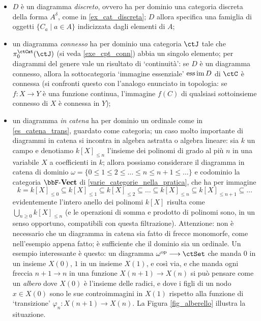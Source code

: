 \begin{itemize}
 \item \(D\) è un diagramma \emph{discreto}, ovvero ha per dominio una categoria discreta della forma \(A^\delta\), come in \ref{ex_cat_discreta}; \(D\) allora specifica una famiglia di oggetti \(\{C_a\mid a\in A\}\) indicizzata dagli elementi di \(A\);
 \item un diagramma \emph{connesso} ha per dominio una categoria \(\ctJ\) tale che \(\pi_0^\ctCat(\ctJ)\) (si veda \ref{exe_cpt_conn}) abbia un singolo elemento; per diagrammi del genere vale un risultato di `continuità': se \(D\) è un diagramma connesso, allora la sottocategoria `immagine essenziale' \(\operatorname*{ess\,im} D\) di \(\ctC\) è connessa (si confronti questo con l'analogo enunciato in topologia: se \(f \colon X\to Y\) è una funzione continua, l'immagine \(f(C)\) di qualsiasi sottoinsieme connesso di \(X\) è	connessa in \(Y\));
 \item un diagramma \emph{in catena} ha per dominio un ordinale come in \ref{es_catena_trans}, guardato come categoria; un caso molto importante di diagrammi in catena si incontra in algebra astratta o algebra lineare: sia \(k\) un campo e denotiamo \(k[X]_{\le n}\)	l'insieme dei polinomi di grado al più \(n\) in una variabile \(X\) a coefficienti in \(k\); allora possiamo considerare il diagramma in catena di dominio \(\omega=\{0\le1\le 2\le\dots\le n\le n+1\le\dots\}\) e codominio la categoria \(\ctVect\) di \ref{varie_categorie_nella_pratica}, che ha per immagine
       \[
        k = k[X]_{\le 0} \subseteq
        k[X]_{\le 1} \subseteq
        k[X]_{\le 2} \subseteq \dots
        \subseteq k[X]_{\le n} \subseteq k[X]_{\le n+1} \subseteq \dots
       \]
       evidentemente l'intero anello dei polinomi \(k[X]\) risulta come \(\bigcup_{n\ge 0} k[X]_{\le n}\) (e le operazioni di somma e prodotto di polinomi sono, in un senso opportuno, compatibili con questa filtrazione). Attenzione: non è necessario che un diagramma in catena sia fatto di frecce monomorfe, come nell'esempio appena fatto; è sufficiente che il dominio sia un ordinale. Un esempio interessante è questo: un diagramma \(\omega^\op\fun\ctSet\) che manda \(0\) in un insieme \(X(0)\), \(1\) in un insieme \(X(1)\), e così via, e che manda ogni freccia \(n+1 \to n\) in una funzione \(X({n+1})\to X(n)\) si può pensare come un \emph{albero} dove \(X(0)\) è l'insieme delle radici, e dove i figli di un nodo \(x\in X(0)\) sono le sue controimmagini in \(X(1)\) rispetto alla funzione di `transizione' \(\varphi_n \colon X({n+1})\to X(n)\). La Figura \ref{fig_alberello} illustra la situazione. %
\end{itemize}
